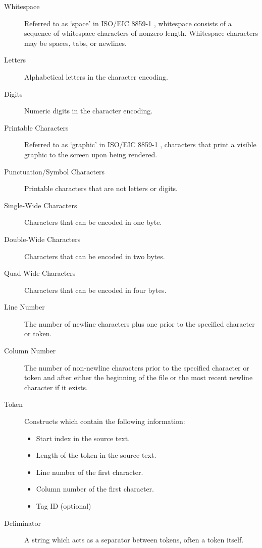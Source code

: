 \documentclass[10pt,a4paper]{article}
\begin{document}
\begin{description}
\item[Whitespace] Referred to as `space' in ISO/EIC 8859-1 \cite{ISO_CharacterEncodings}, whitespace consists of a sequence of whitespace characters of nonzero length. Whitespace characters may be spaces, tabs, or newlines.

\item[Letters] Alphabetical letters in the character encoding.

\item[Digits] Numeric digits in the character encoding.

\item[Printable Characters] Referred to as `graphic' in ISO/EIC 8859-1 \cite{ISO_CharacterEncodings}, characters that print a visible graphic to the screen upon being rendered.

\item[Punctuation/Symbol Characters] Printable characters that are not letters or digits.

\item[Single-Wide Characters] Characters that can be encoded in one byte.

\item[Double-Wide Characters] Characters that can be encoded in two bytes.

\item[Quad-Wide Characters] Characters that can be encoded in four bytes.

\item[Line Number] The number of newline characters plus one prior to the specified character or token.

\item[Column Number] The number of non-newline characters prior to the specified character or token and after either the beginning of the file or the most recent newline character if it exists.

\item[Token] Constructs which contain the following information:
	\begin{itemize}
	\item Start index in the source text.
	\item Length of the token in the source text.
	\item Line number of the first character.
	\item Column number of the first character.
	\item Tag ID (optional)
	\end{itemize}

\item[Deliminator] A string which acts as a separator between tokens, often a token itself.
\end{description}
\end{document}

